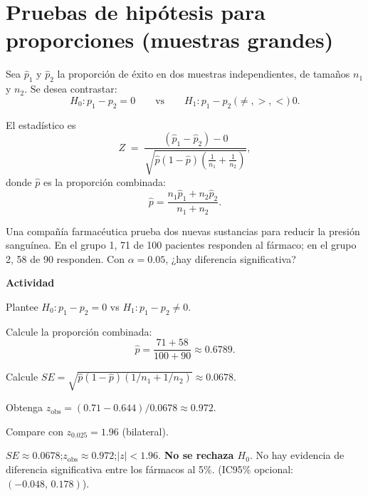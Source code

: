 
\section{Pruebas de hipótesis para proporciones (muestras grandes)}

Sea $\hat{p}_1$ y $\hat{p}_2$ la proporción de éxito en dos muestras independientes, de tamaños $n_1$ y $n_2$.
Se desea contrastar:
\[
H_0: p_1-p_2=0
\qquad\text{vs}\qquad
H_1: p_1-p_2 \ \text{(}\neq,>,<\text{)}\ 0.
\]

El estadístico es
\[
Z \;=\; \frac{(\hat{p}_1-\hat{p}_2)-0}{\sqrt{\hat{p}(1-\hat{p})\left(\tfrac{1}{n_1}+\tfrac{1}{n_2}\right)}},
\]
donde $\hat{p}$ es la proporción combinada:
\[
\hat{p} = \frac{n_1\hat{p}_1+n_2\hat{p}_2}{n_1+n_2}.
\]

\begin{ejercicio}
Una compañía farmacéutica prueba dos nuevas sustancias para reducir la presión sanguínea.
En el grupo 1, 71 de 100 pacientes responden al fármaco;
en el grupo 2, 58 de 90 responden.
Con $\alpha=0.05$, ¿hay diferencia significativa?


\textbf{Actividad}
\begin{pasos}
  \item Plantee $H_0: p_1-p_2=0$ \;vs\; $H_1: p_1-p_2\neq 0$.
  \item Calcule la proporción combinada:
  \[
  \hat{p}=\frac{71+58}{100+90}\approx 0.6789.
  \]
  \item Calcule $SE=\sqrt{\hat{p}(1-\hat{p})(1/n_1+1/n_2)}\approx 0.0678$.
  \item Obtenga $z_{\text{obs}}=(0.71-0.644)/0.0678\approx 0.972$.
  \item Compare con $z_{0.025}=1.96$ (bilateral).
\end{pasos}

\begin{clave}
$SE\approx 0.0678$;\quad $z_{\text{obs}}\approx 0.972$;\quad $|z|<1.96$.
\textbf{No se rechaza $H_0$}. No hay evidencia de diferencia significativa entre los fármacos al 5\%.
(IC95\% opcional: $(-0.048,\,0.178)$).
\end{clave}
\end{ejercicio}



